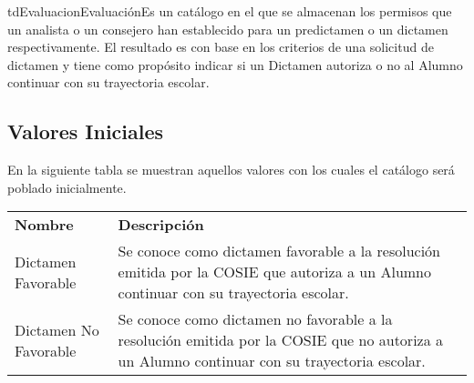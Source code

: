 	\begin{TipoDeDato}{tdEvaluacion}{Evaluación}{Es un catálogo en el que se almacenan los permisos que un analista o un consejero han establecido para un predictamen o un dictamen respectivamente. El resultado es con base en los criterios de una solicitud de dictamen y tiene como propósito indicar si un Dictamen autoriza o no al Alumno continuar con su trayectoria escolar.}
	
	\begin{tdAtributos}
	\end{tdAtributos}
	
	\subsection{Valores Iniciales}
	
	En la siguiente tabla se muestran aquellos valores con los cuales el catálogo será poblado inicialmente.\cdtEmpty
	
	\begin{longtable}{| p{} | p{} |}
	 	\rowcolor{colorPrincipal}
	 	\multicolumn{2}{|c|}{\bf \color{white} Valores Iniciales}\\
	 	\hline
	 	\rowcolor{colorSecundario}
	 	\bf \color{white} Nombre & \bf \color{white}Descripción \\
	 	\endhead
	 	\hline
	 		Dictamen Favorable & Se conoce como dictamen favorable a la resolución emitida por la COSIE que  autoriza a un Alumno continuar con su trayectoria escolar.\\
	 	\hline
	 		Dictamen No Favorable & Se conoce como dictamen no favorable a la resolución emitida por la COSIE que no autoriza a un Alumno continuar con su trayectoria escolar.\\
	 	\hline
	 \end{longtable}
	
   \end{TipoDeDato}
   
